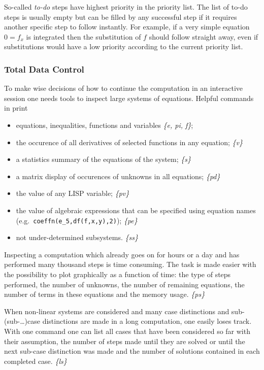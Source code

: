 So-called \emph{to-do} steps have highest priority in the priority
list.  The list of to-do steps is usually empty but can be filled by
any successful step if it requires another specific step to follow
instantly.  For example, if a very simple equation $0=f_x$ is
integrated then the substitution of $f$ should follow straight away,
even if substitutions would have a low priority according to the
current priority list.

\subsubsection{Total Data Control}

To make wise decisions of how to continue the computation in an
interactive session one needs tools to inspect large systems of
equations.  Helpful commands in  print
\begin{itemize}
\item equations, inequalities, functions and variables \emph{\{e, pi, f\}};
\item the occurence of all derivatives of selected functions in any
  equation; \emph{\{v\}}
\item a statistics summary of the equations of the system;
  \emph{\{s\}}
\item a matrix display of occurences of unknowns in all equations;
  \emph{\{pd\}}
\item the value of any LISP variable; \emph{\{pv\}}
\item the value of algebraic expressions that can be specified using
  equation names (e.g.\ \texttt{coeffn(e\_5,df(f,x,y),2)});
  \emph{\{pe\}}
\item not under-determined subsystems. \emph{\{ss\}}
\end{itemize}

Inspecting a computation which already goes on for hours or a day and
has performed many thousand steps is time consuming.  The task is made
easier with the possibility to plot graphically as a function of time:
the type of steps performed, the number of unknowns, the number of
remaining equations, the number of terms in these equations and the
memory usage. \emph{\{ps\}}

When non-linear systems are considered and many case distinctions and
sub-(sub-\ldots)case distinctions are made in a long computation, one
easily loses track.  With one command one can list all cases that have
been considered so far with their assumption, the number of steps made
until they are solved or until the next sub-case distinction was made
and the number of solutions contained in each completed case.
\emph{\{ls\}}

